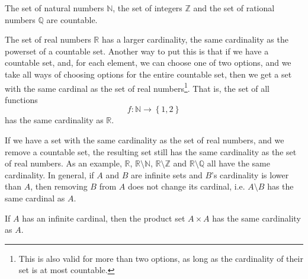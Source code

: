 \documentclass[a4paper
,draft
]{article}
\def\reale{\mathbb{R}}
\def\intregi{\mathbb{Z}}
\def\naturale{\mathbb{N}}
\def\rationale{\mathbb{Q}}
\newcommand{\multime}[1]{\left\{ #1 \right\}}
\begin{document}
The set of natural numbers $\naturale$, the set of integers $\intregi$ and
the set of rational numbers $\rationale$ are countable.

The set of real numbers $\reale$ has a larger cardinality, the same cardinality
as the powerset of a countable set. Another way to put this is that
if we have a countable set, and, for each element, we can choose one of two
options,
and we take all ways of choosing options for the entire countable set,
then we get a set with the same cardinal as the set of real numbers\footnote{
    This is also valid for more than two options, as long as the cardinality
    of their set is at most countable.
  }.
That is, the set of all functions
$$
f : \naturale \longrightarrow \multime{1, 2}
$$
has the same cardinality as $\reale$.

If we have a set with the same cardinality as the set of real numbers, and
we remove a countable set, the resulting set still has the same cardinality
as the set of real numbers. As an example, $\reale$, $\reale\setminus\naturale$,
$\reale\setminus\intregi$ and $\reale\setminus\rationale$ all have the same
cardinality. In general, if $A$ and $B$ are infinite sets and
$B$'s cardinality is lower than $A$, then removing $B$ from $A$ does not change
its cardinal, i.e. $A\setminus B$ has the same cardinal as $A$.

If $A$ has an infinite cardinal, then the product set $A\times A$ has the same
cardinality as $A$.

\printbibliography
\end{document}

